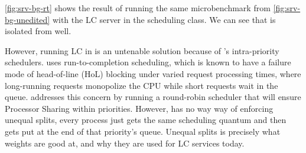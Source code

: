 \autoref{fig:srv-bg-rt} shows the result of running the same microbenchmark from
\autoref{fig:srv-bg-unedited} with the LC server in the \rtclass{} scheduling
class. We can see that \rtclass{} is isolated from \normalclass{} well.

However, running LC in \rtclass{} is an untenable solution because of
\rtclass{}'s intra-priority schedulers. \schedfifo{} uses run-to-completion
scheduling, which is known to have a failure mode of head-of-line (HoL) blocking
under varied request processing times, where long-running requests monopolize
the CPU while short requests wait in the queue. \schedrr{} addresses this
concern by running a round-robin scheduler that will ensure Processor Sharing
within priorities. However, \schedrr{} has no way way of enforcing unequal
splits, every process just gets the same scheduling quantum and then gets put at
the end of that priority's queue. Unequal splits is precisely what weights are
good at, and why they are used for LC services today.


